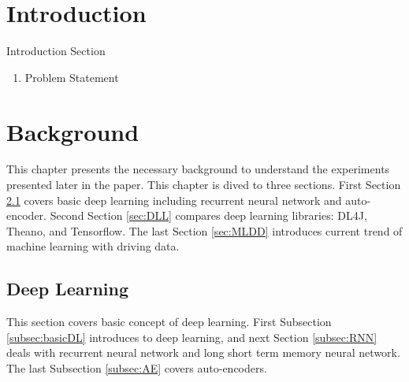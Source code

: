 \documentclass[draft,dvipsnames]{drexel-thesis}
\begin{document}
\begin{thesis}



\chapter{Introduction}\label{chap:intro}

Introduction Section
\begin{enumerate}
\item Problem Statement
\end{enumerate}



\chapter{Background}\label{sec:bg}
This chapter presents the necessary background to understand the experiments presented later in the paper. This chapter is dived to three sections. First Section \ref{sec:DL} covers basic deep learning including recurrent neural network and auto-encoder. Second Section \ref{sec:DLL} compares deep learning libraries: DL4J, Theano, and Tensorflow. The last Section \ref{sec:MLDD} introduces current trend of machine learning with driving data.

\section{Deep Learning}\label{sec:DL}
This section covers basic concept of deep learning. First Subsection \ref{subsec:basicDL} introduces to deep learning, and next Section \ref{subsec:RNN} deals with recurrent neural network and long short term memory neural network. The last Subsection \ref{subsec:AE} covers auto-encoders.


\end{thesis}
\end{document}
